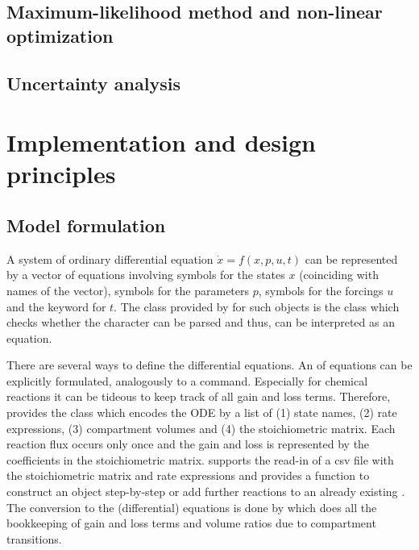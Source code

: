 \documentclass[article]{jss}
\begin{document}
\subsection{Maximum-likelihood method and non-linear optimization}

\subsection{Uncertainty analysis}



\section{Implementation and design principles}

\subsection{Model formulation}

A system of ordinary differential equation $\dot x = f(x, p, u, t)$ can be represented by a  vector of equations involving symbols for the states $x$ (coinciding with names of the vector), symbols for the parameters $p$, symbols for the forcings $u$ and the keyword  for $t$. The class provided by  for such objects is the  class which checks whether the character can be parsed and thus, can be interpreted as an equation.

There are several ways to define the differential equations. An  of equations can be explicitly formulated, analogously to a  command. Especially for chemical reactions it can be tideous to keep track of all gain and loss terms. Therefore,  provides the  class which encodes the ODE by a list of (1) state names, (2) rate expressions, (3) compartment volumes and (4) the stoichiometric matrix. Each reaction flux occurs only once and the gain and loss is represented by the coefficients in the stoichiometric matrix.  supports the read-in of a csv file with the stoichiometric matrix and rate expressions and provides a function  to construct an  object step-by-step or add further reactions to an already existing . The conversion to the (differential) equations is done by  which does all the bookkeeping of gain and loss terms and volume ratios due to compartment transitions.
\end{document}
